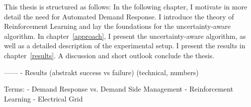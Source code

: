 This thesis is structured as follows: In the following chapter, I motivate in more detail the need for Automated Demand Response. I introduce the theory of Reinforcement Learning and lay the foundations for the uncertainty-aware algorithm.
In chapter~\ref{approach}, I present the uncertainty-aware algorithm, as well as a detailed description of the experimental setup.
I present the results in chapter~\ref{results}. A discussion and short outlook conclude the thesis.


 ------
- Results (abstrakt success vs failure) (technical, numbers)

Terms:
- Demand Response vs. Demand Side Management
- Reinforcement Learning
- Electrical Grid
